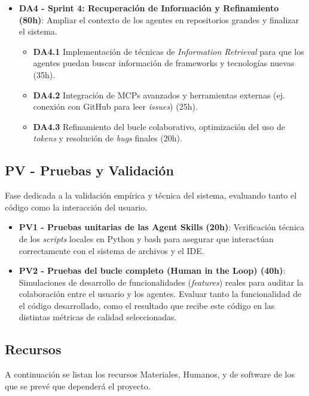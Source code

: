 \documentclass[11pt, letterpaper]{article}
\begin{document}
\begin{itemize}
    \item \textbf{DA4 - Sprint 4: Recuperación de Información y Refinamiento (80h)}: Ampliar el contexto de los agentes en repositorios grandes y finalizar el sistema.
    \begin{itemize}
        \item \textbf{DA4.1} Implementación de técnicas de \textit{Information Retrieval} para que los agentes puedan buscar información de frameworks y tecnologías nuevas (35h).
        \item \textbf{DA4.2} Integración de MCPs avanzados y herramientas externas (ej. conexión con GitHub para leer \textit{issues}) (25h).
        \item \textbf{DA4.3} Refinamiento del bucle colaborativo, optimización del uso de \textit{tokens} y resolución de \textit{bugs} finales (20h).
    \end{itemize}
\end{itemize}

\subsection{PV - Pruebas y Validación}
Fase dedicada a la validación empírica y técnica del sistema, evaluando tanto el código como la interacción del usuario.
\begin{itemize}
    \item \textbf{PV1 - Pruebas unitarias de las Agent Skills (20h)}: Verificación técnica de los \textit{scripts} locales en Python y bash para asegurar que interactúan correctamente con el sistema de archivos y el IDE.
    \item \textbf{PV2 - Pruebas del bucle completo (Human in the Loop) (40h)}: Simulaciones de desarrollo de funcionalidades (\textit{features}) reales para auditar la colaboración entre el usuario y los agentes. Evaluar tanto la funcionalidad de el código desarrollado, como el resultado que recibe este código en las distintas métricas de calidad seleccionadas.
\end{itemize}

\newpage

\subsection{Recursos}
A continuación se listan los recursos Materiales, Humanos, y de software de los que se prevé que dependerá el proyecto.
\end{document}
